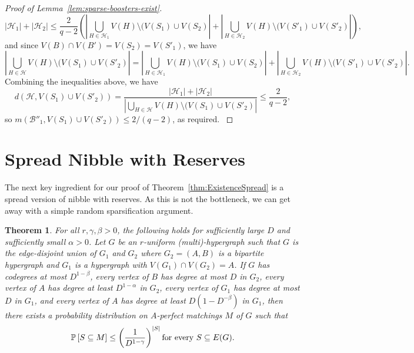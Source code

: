 \documentclass[11pt]{article}
\numberwithin{equation}{section}
\newcounter{i}
\theoremstyle{plain}
\newtheorem{thm}{Theorem}[section]
\theoremstyle{plain} %
\theoremstyle{definition}
\newcommand{\cB}{\mathcal{B}}
\newcommand{\cH}{\mathcal{H}}
\newcommand{\Prob}[1]{\ensuremath{%
\mathbb P\left[#1\right]
}}
\begin{document}
\begin{proof}[Proof of Lemma~\ref{lem:sparse-boosters-exist}]
{\begin{equation*}
        |\cH_1| + |\cH_2| \leq \frac{2}{q - 2}\left(|\bigcup_{H \in \cH_1}V(H)\setminus (V(S_1) \cup V(S_2)| + |\bigcup_{H \in \cH_2}V(H)\setminus (V(S'_1) \cup V(S'_2)|\right),
    \end{equation*}
    and since $V(B) \cap V(B') = V(S_2) = V(S'_1)$, we have
    \begin{equation*}
        |\bigcup_{H \in \cH}V(H)\setminus (V(S_1) \cup V(S'_2)| = |\bigcup_{H \in \cH_1}V(H)\setminus (V(S_1) \cup V(S_2)| + |\bigcup_{H \in \cH_2}V(H)\setminus (V(S'_1) \cup V(S'_2)|.
    \end{equation*}
    Combining the inequalities above, we have
    \begin{equation*}
        d(\cH, V(S_1) \cup V(S'_2)) = \frac{|\cH_1| + |\cH_2|}{|\bigcup_{H \in \cH}V(H)\setminus (V(S_1) \cup V(S'_2)|} \leq \frac{2}{q-2},
    \end{equation*}
    so $m(\cB''_1, V(S_1)\cup V(S'_2)) \leq 2 / (q - 2)$, as required.
    }
\end{proof}


\section{Spread Nibble with Reserves}\label{s:SpreadNibble}

The next key ingredient for our proof of Theorem~\ref{thm:ExistenceSpread} is a spread version of nibble with reserves.  As this is not the bottleneck, we can get away with a simple random sparsification argument.

\begin{thm}\label{thm:spread-nibble}
  For all $r, \gamma, \beta > 0$, the following holds for sufficiently large $D$ and sufficiently small $\alpha > 0$.
  Let $G$ be an $r$-uniform (multi)-hypergraph such that $G$ is the edge-disjoint union of $G_1$ and $G_2$ where $G_2=(A,B)$ is a bipartite hypergraph and $G_1$ is a hypergraph with $V(G_1)\cap V(G_2) = A$.
  If $G$ has codegrees at most $D^{1-\beta}$, every vertex of $B$ has degree at most $D$ in $G_2$, every vertex of $A$ has degree at least $D^{1-\alpha}$ in $G_2$, every vertex of $G_1$ has degree at most $D$ in $G_1$, and every vertex of $A$ has degree at least $D\left(1- D^{-\beta}\right)$ in $G_1$,
  then there exists a probability distribution on $A$-perfect matchings $M$ of $G$ such that
  \begin{equation*}
    \Prob{S \subseteq M} \leq \left(\frac{1}{D^{1 - \gamma}}\right)^{|S|} \text{for every $S \subseteq E(G)$}.
  \end{equation*}
\end{thm}
\end{document}
